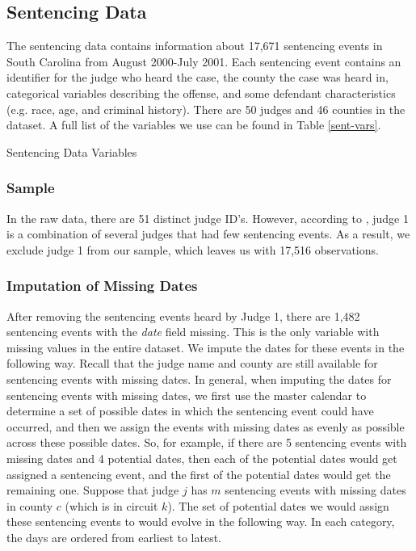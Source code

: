\documentclass[11pt]{article}
\theoremstyle{ModifiedStyle}
\begin{document}
  \subsection{Sentencing Data}
    The sentencing data contains information about 17,671 sentencing events in South Carolina from August 2000-July 2001. Each sentencing event contains an identifier for the judge who heard the case, the county the case was heard in, categorical variables describing the offense, and some defendant characteristics (e.g. race, age, and criminal history). There are 50 judges and 46 counties in the dataset. A full list of the variables we use can be found in Table \ref{sent-vars}.

    \begin{table}[H]
      \caption{Sentencing Data Variables}
      \label{sent-vars}
      
    \end{table}

    \subsubsection{Sample}
      In the raw data, there are 51 distinct judge ID's. However, according to \cite{hester2017conditional}, judge 1 is a combination of several judges that had few sentencing events. As a result, we exclude judge 1 from our sample, which leaves us with 17,516 observations.

    \subsubsection{Imputation of Missing Dates}
      After removing the sentencing events heard by Judge 1, there are 1,482 sentencing events with the \textit{date} field missing. This is the only variable with missing values in the entire dataset. We impute the dates for these events in the following way. Recall that the judge name and county are still available for sentencing events with missing dates. In general, when imputing the dates for sentencing events with missing dates, we first use the master calendar to determine a set of possible dates in which the sentencing event could have occurred, and then we assign the events with missing dates as evenly as possible across these possible dates. So, for example, if there are 5 sentencing events with missing dates and 4 potential dates, then each of the potential dates would get assigned a sentencing event, and the first of the potential dates would get the remaining one.
      Suppose that judge $j$ has $m$ sentencing events with missing dates in county $c$ (which is in circuit $k$). The set of potential dates we would assign these sentencing events to would evolve in the following way. In each category, the days are ordered from earliest to latest.
\end{document}
